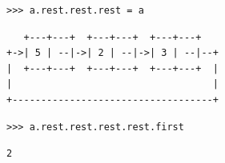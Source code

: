 \begin{blocksection}
\begin{lstlisting}
>>> a.rest.rest.rest = a
\end{lstlisting}
\begin{solution}[0in]
\begin{lstlisting}
   +---+---+  +---+---+  +---+---+
+->| 5 | --|->| 2 | --|->| 3 | --|--+
|  +---+---+  +---+---+  +---+---+  |
|                                   |
+-----------------------------------+
\end{lstlisting}
\end{solution}

\begin{lstlisting}
>>> a.rest.rest.rest.rest.first
\end{lstlisting}
\begin{solution}[.25in]
\begin{lstlisting}
2
\end{lstlisting}
\end{solution}
\end{blocksection}

